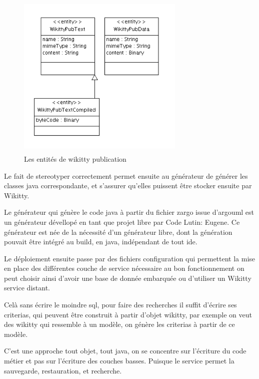 \begin{figure}[!ht]
\centering
\includegraphics[height=8cm,width=8cm]{image/wikittypubuml.png}
  		\caption{Les entités de wikitty publication}
  		\label{umlwikittypub}
\end{figure}

Le fait de stereotyper correctement permet ensuite au générateur de générer
les classes java correspondante, et s'assurer qu'elles puissent être stocker
ensuite par Wikitty.

Le générateur qui génère le code java à partir du fichier zargo issue d'argouml
est un générateur dévellopé en tant que projet libre par Code Lutin: Eugene.
Ce générateur est née de la nécessité d'un générateur libre, dont la génération
pouvait être intégré au build, en java, indépendant de tout ide.

Le déploiement ensuite passe par des fichiers configuration qui permettent la
mise en place des différentes couche de service nécessaire au bon fonctionnement
on peut choisir ainsi d'avoir une base de donnée embarquée ou d'utiliser un
Wikitty service distant.

Celà sans écrire le moindre sql, pour faire des recherches il suffit d'écrire
ses criterias, qui peuvent être construit à partir d'objet wikitty, par exemple 
on veut des wikitty qui ressemble à un modèle, on génère les criterias à partir
de ce modèle.

C'est une approche tout objet, tout java, on se concentre sur l'écriture du code
métier et pas sur l'écriture des couches basses. Puisque le service permet la
sauvegarde, restauration, et recherche. 

% 
% 


